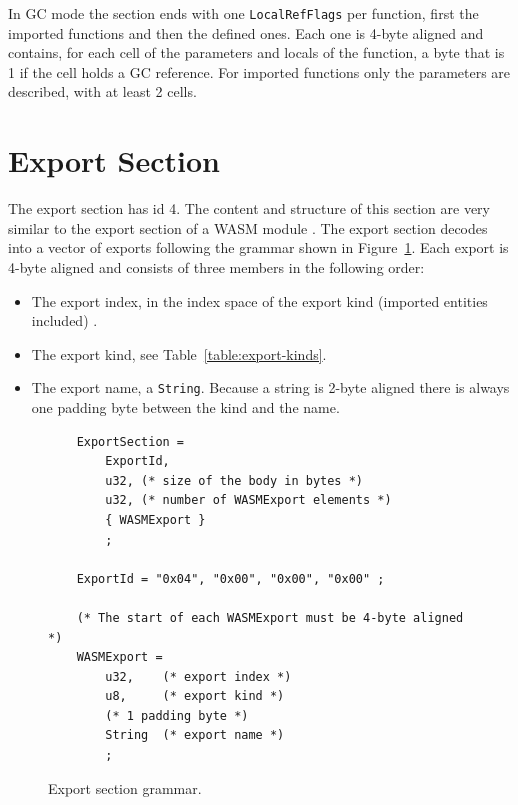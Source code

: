 \documentclass{article}
\begin{document}
In GC mode the section ends with one \verb|LocalRefFlags| per function, first the imported functions and then the defined ones.
Each one is 4-byte aligned and contains, for each cell of the parameters and locals of the function, a byte that is 1 if the cell holds a GC reference.
For imported functions only the parameters are described, with at least 2 cells.

\section{Export Section}
\label{sec:export}

The export section has id 4.
The content and structure of this section are very similar to the export section of a WASM module \cite[Sec.~5.5.10]{webassembly2019core}.
The export section decodes into a vector of exports following the grammar shown in Figure~\ref{figure:export-section-grammar}.
Each export is 4-byte aligned and consists of three members in the following order:
\begin{itemize}
    \item The export index, in the index space of the export kind (imported entities included) \cite[Sec.~5.5.10]{webassembly2019core}.
    \item The export kind, see Table~\ref{table:export-kinds}.
    \item The export name, a \verb|String|. Because a string is 2-byte aligned there is always one padding byte between the kind and the name.
\end{itemize}

\begin{figure}[H]
\begin{verbatim}
    ExportSection =
        ExportId,
        u32, (* size of the body in bytes *)
        u32, (* number of WASMExport elements *)
        { WASMExport }
        ;

    ExportId = "0x04", "0x00", "0x00", "0x00" ;

    (* The start of each WASMExport must be 4-byte aligned *)
    WASMExport =
        u32,    (* export index *)
        u8,     (* export kind *)
        (* 1 padding byte *)
        String  (* export name *)
        ;
\end{verbatim}
\caption{Export section grammar.}
\label{figure:export-section-grammar}
\end{figure}
\end{document}
